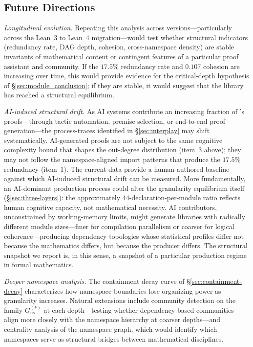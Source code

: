 \subsection{Future Directions}
\label{sec:future}

\emph{Longitudinal evolution.} Repeating this analysis across  versions---particularly across the Lean~3 to Lean~4 migration---would test whether structural indicators (redundancy rate, DAG depth, cohesion, cross-namespace density) are stable invariants of mathematical content or contingent features of a particular proof assistant and community. If the $17.5\%$ redundancy rate and $0.107$ cohesion are increasing over time, this would provide evidence for the critical-depth hypothesis of \S\ref{sec:module_conclusion}; if they are stable, it would suggest that the library has reached a structural equilibrium.

\emph{AI-induced structural drift.} As AI systems contribute an increasing fraction of 's proofs---through tactic automation, premise selection, or end-to-end proof generation---the process-traces identified in \S\ref{sec:interplay} may shift systematically. AI-generated proofs are not subject to the same cognitive complexity bound that shapes the out-degree distribution (item~3 above); they may not follow the namespace-aligned import patterns that produce the $17.5\%$ redundancy (item~1). The current data provide a human-authored baseline against which AI-induced structural drift can be measured. More fundamentally, an AI-dominant production process could alter the granularity equilibrium itself (\S\ref{sec:three-layers}): the approximately $44$-declaration-per-module ratio reflects human cognitive capacity, not mathematical necessity. AI contributors, unconstrained by working-memory limits, might generate libraries with radically different module sizes---finer for compilation parallelism or coarser for logical coherence---producing dependency topologies whose statistical profiles differ not because the mathematics differs, but because the producer differs. The structural snapshot we report is, in this sense, a snapshot of a particular production regime in formal mathematics.

\emph{Deeper namespace analysis.} The containment decay curve of \S\ref{sec:containment-decay} characterizes how namespace boundaries lose organizing power as granularity increases. Natural extensions include community detection on the family $G_{\mathrm{ns}}^{(k)}$ at each depth---testing whether dependency-based communities align more closely with the namespace hierarchy at coarser depths---and centrality analysis of the namespace graph, which would identify which namespaces serve as structural bridges between mathematical disciplines.

